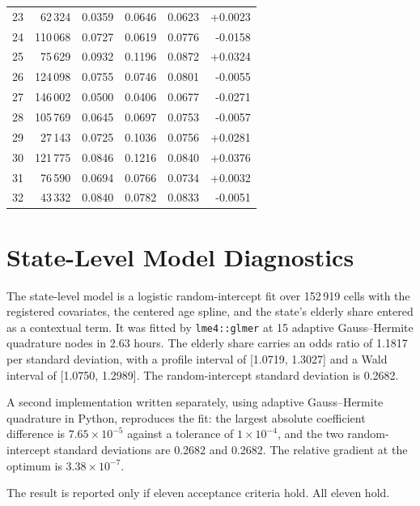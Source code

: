 \documentclass[11pt]{article}
\begin{document}
\begin{longtable}{rrrrrr}
23 & 62\,324 & 0.0359 & 0.0646 & 0.0623 & +0.0023 \\
24 & 110\,068 & 0.0727 & 0.0619 & 0.0776 & -0.0158 \\
25 & 75\,629 & 0.0932 & 0.1196 & 0.0872 & +0.0324 \\
26 & 124\,098 & 0.0755 & 0.0746 & 0.0801 & -0.0055 \\
27 & 146\,002 & 0.0500 & 0.0406 & 0.0677 & -0.0271 \\
28 & 105\,769 & 0.0645 & 0.0697 & 0.0753 & -0.0057 \\
29 & 27\,143 & 0.0725 & 0.1036 & 0.0756 & +0.0281 \\
30 & 121\,775 & 0.0846 & 0.1216 & 0.0840 & +0.0376 \\
31 & 76\,590 & 0.0694 & 0.0766 & 0.0734 & +0.0032 \\
32 & 43\,332 & 0.0840 & 0.0782 & 0.0833 & -0.0051 \\
\end{longtable}
\endgroup

\section{State-Level Model Diagnostics}
\label{supp:glmm}

The state-level model is a logistic random-intercept fit over
152\,919 cells with the registered covariates, the centered
age spline, and the state's elderly share entered as a contextual term.  It was
fitted by \texttt{lme4::glmer} at 15
adaptive Gauss--Hermite quadrature nodes in
2.63 hours.  The elderly share carries an odds ratio of
1.1817 per standard deviation, with a profile interval of
[1.0719, 1.3027] and a Wald interval of
[1.0750, 1.2989].  The random-intercept
standard deviation is 0.2682.

A second implementation written separately, using adaptive Gauss--Hermite
quadrature in Python, reproduces the fit: the largest absolute coefficient
difference is $7.65 \times 10^{-5}$ against a
tolerance of $1 \times 10^{-4}$, and the two random-intercept standard
deviations are 0.2682 and 0.2682.  The
relative gradient at the optimum is
$3.38 \times 10^{-7}$.

The result is reported only if eleven acceptance criteria hold.  All eleven hold.
\end{document}
